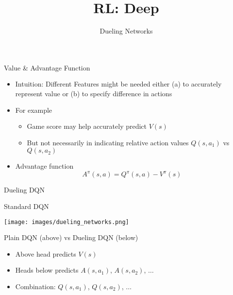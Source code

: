 \documentclass[aspectratio=169]{../latex_main/tntbeamer}  %
\title[RL: Deep Reinforcement Learning]{RL: Deep}
\subtitle{Dueling Networks}
\begin{document}
	
	\maketitle

\begin{frame}[c]{Value \& Advantage Function}
	

\begin{itemize}
	\item Intuition: Different Features might be needed either (a) to accurately represent value or (b)
	to specify difference in actions
	\item For example
	\begin{itemize}
		\item Game score may help accurately predict $V(s)$
		\item But not necessarily in indicating relative action values $Q(s,a_1)$ vs $Q(s,a_2)$
	\end{itemize}
	\item Advantage function \\
	$$A^\pi (s,a) = Q^\pi(s,a) - V^\pi(s) $$
\end{itemize}
	
\end{frame}
\begin{frame}[c]{Dueling DQN~}

\begin{center}
Standard DQN

\vspace{-2em}
\texttt{[image: images/dueling\_networks.png]}

Plain DQN (above) vs Dueling DQN (below)
\end{center}

\begin{itemize}
	\item Above head predicts $V(s)$
	\item Heads below predicts $A(s,a_1)$, $A(s,a_2)$, $\ldots$
	\item Combination: $Q(s,a_1)$, $Q(s,a_2)$, $\ldots$
\end{itemize}
	
\end{frame}
\end{document}
